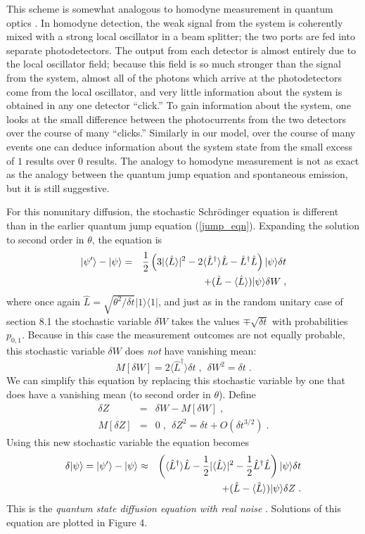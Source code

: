 \documentclass[12pt]{article}
\def\bra#1{{\langle #1 |}}
\def\ket#1{{| #1 \rangle}}
\def\expect#1{{\langle #1 \rangle}}
\def\L{{\hat L}}
\def\Ldag{{\hat L^\dagger}}
\begin{document}
This scheme is somewhat analogous to homodyne measurement in quantum optics
\cite{Carmichael,Wiseman}.  In homodyne detection, the weak signal from the
system is coherently mixed with a strong local oscillator in a beam splitter;
the two ports are fed into separate photodetectors.  The output from each
detector is almost entirely due to the local oscillator field; because
this field is so much stronger than the signal from the system, almost
all of the photons which arrive at the photodetectors come from the local
oscillator, and very little information about the system is obtained
in any one detector ``click.''  To gain information about the system, one
looks at the small difference between the photocurrents from the two detectors
over the course of many ``clicks.''  Similarly in our model,
over the course of many events one can deduce information
about the system state from the small excess of $1$ results over $0$ results.
The analogy to homodyne measurement is not as exact as the analogy between
the quantum jump equation and spontaneous emission, but it is still
suggestive.

For this nonunitary diffusion, the stochastic Schr\"odinger equation
is different than in the earlier quantum jump equation (\ref{jump_eqn}).
Expanding the solution to second order in $\theta$, the equation is
\begin{eqnarray}
\ket{\psi'} - \ket\psi &=&
  {1\over2}\left(3|\expect{\L}|^2 - 2\expect{\Ldag}\L
  - \Ldag\L\right)\ket\psi \delta t \nonumber\\
&& + (\L - \expect{\L})\ket\psi \delta W \;,
\end{eqnarray}
where once again $\L = \sqrt{\theta^2/\delta t}\ket1\bra1$, and
just as in the random unitary case of section 8.1 the stochastic
variable $\delta W$ takes the values $\mp \sqrt{\delta t}$ with 
probabilities $p_{0,1}$.
Because in this case the measurement outcomes are not equally probable,
this stochastic variable $\delta W$ does {\it not} have vanishing mean:
\begin{equation}
M[\delta W] = 2\expect{\Ldag}\delta t \;, \ \ \delta W^2 = \delta t \;.
\end{equation}
We can simplify this equation by replacing this stochastic variable by
one that does have a vanishing mean (to second order in $\theta$).  Define
\begin{eqnarray}
\delta Z &=& \delta W - M[\delta W] \;, \nonumber\\
M[\delta Z] &=& 0 \;, \ \ \delta Z^2 = \delta t + O(\delta t^{3/2}) \;.
\end{eqnarray}
Using this new stochastic variable the equation becomes
\begin{eqnarray}
\delta\ket\psi = \ket{\psi'} - \ket\psi &\approx& 
  \left( \expect{\Ldag}\L - {1\over2}|\expect{\L}|^2
  - {1\over2}\Ldag\L\right)\ket\psi \delta t \nonumber\\
&& + (\L - \expect{\L})\ket\psi \delta Z \;.
\label{real_qsd}
\end{eqnarray}
This is the {\it quantum state diffusion equation with real noise}
\cite{Gisin1}.  Solutions of this equation are plotted in Figure 4.
\end{document}
